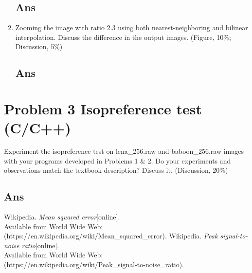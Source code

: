 \documentclass[a4paper, 11pt]{article}
\begin{document}
\begin{enumerate}[label=\alph*.]
    \subsection*{Ans}
  \item 
    Zooming the image with ratio 2.3 using both nearest-neighboring and bilinear interpolation.
    Discuss the difference in the output images. (Figure, 10\%; Discussion, 5\%)
    \subsection*{Ans}
\end{enumerate}

\section*{Problem 3 Isopreference test (C/C++)}
  Experiment the isopreference test on lena\_256.raw and baboon\_256.raw images with your
  programs developed in Problems 1 \& 2. Do your experiments and observations match the textbook
  description? Discuss it. (Discussion, 20\%)
  \subsection*{Ans}

\begin{thebibliography}{9}
   Wikipedia. \emph{Mean squared error}[online]. \\
  Available from World Wide Web: (https://en.wikipedia.org/wiki/Mean\_squared\_error).
   Wikipedia. \emph{Peak signal-to-noise ratio}[online].\\
  Available from World Wide Web: \\
  (https://en.wikipedia.org/wiki/Peak\_signal-to-noise\_ratio).
\end{thebibliography}
\end{document}
